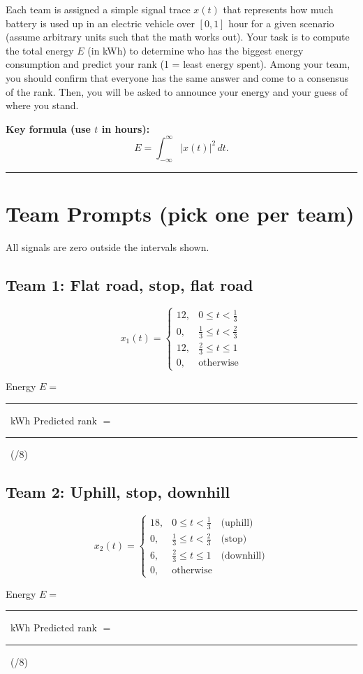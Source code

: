 \documentclass{ee102_notes}
\newcommand{\Eblank}{\rule{3cm}{0.4pt}}
\newcommand{\Rankblank}{\rule{3cm}{0.4pt}}
\begin{document}
\noindent Each team is assigned a simple signal trace \(x(t)\)  that represents how much battery is used up in an electric vehicle over \([0,1]\) hour for a given scenario (assume arbitrary units such that the math works out). Your task is to compute the total energy \(E\) (in \si{kWh}) to determine who has the biggest energy consumption and predict your rank (1 = least energy spent). Among your team, you should confirm that everyone has the same answer and come to a consensus of the rank. Then, you will be asked to announce your energy and your guess of where you stand.

\medskip

\textbf{Key formula (use \(t\) in hours):}
\[
E  = \int_{-\infty}^{\infty} |x(t)|^2 \,dt.
\]

\bigskip
\hrule
\bigskip

\section*{Team Prompts (pick one per team)}
All signals are zero outside the intervals shown.

\subsection*{Team 1: Flat road, stop, flat road}
\[
x_1(t)=
\begin{cases}
12, & 0 \le t < \tfrac{1}{3} \\
0, & \tfrac{1}{3} \le t < \tfrac{2}{3} \\
12, & \tfrac{2}{3} \le t \le 1 \\
0, & \text{otherwise}
\end{cases}
\]
\begin{tcolorbox}[title=Team 1: Record your results]
Energy \(E=\) \Eblank\ \si{kWh} \quad\quad Predicted rank \(=\) \Rankblank\ (/8)
\end{tcolorbox}

\subsection*{Team 2: Uphill, stop, downhill}
\[
x_2(t)=
\begin{cases}
18, & 0 \le t < \tfrac{1}{3} \quad\text{(uphill)}\\
0,  & \tfrac{1}{3} \le t < \tfrac{2}{3} \quad\text{(stop)}\\
6,  & \tfrac{2}{3} \le t \le 1 \quad\text{(downhill)}\\
0,  & \text{otherwise}
\end{cases}
\]
\begin{tcolorbox}[title=Team 2: Record your results]
Energy \(E=\) \Eblank\ \si{kWh} \quad\quad Predicted rank \(=\) \Rankblank\ (/8)
\end{tcolorbox}
\end{document}

